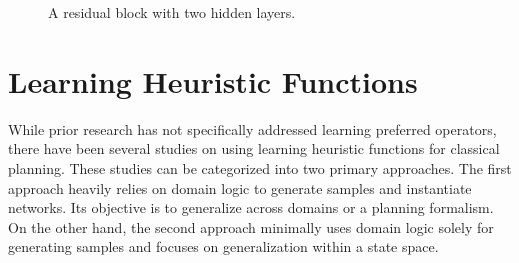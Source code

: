 \documentclass[ppgc,diss,english]{iiufrgs}
\begin{document}
\begin{figure}[tb]
\caption[A residual block]{A residual block with two hidden layers.}
\centering
{}
\label{fig:residual-block}
\end{figure}

\section{Learning Heuristic Functions}
\label{sec:related-h}
While prior research has not specifically addressed learning preferred operators, there have been several studies on using learning heuristic functions for classical planning. These studies can be categorized into two primary approaches.
The first approach heavily relies on domain logic to generate samples and instantiate networks. Its objective is to generalize across domains or a planning formalism.
On the other hand, the second approach minimally uses domain logic solely for generating samples and focuses on generalization within a state space.
\end{document}
